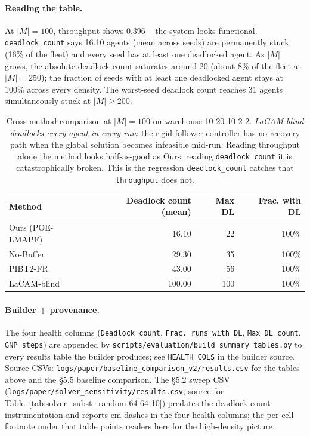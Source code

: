 \paragraph{Reading the table.}  At $|M| = 100$, throughput shows
0.396 -- the system looks functional.  \texttt{deadlock\_count} says
16.10 agents (mean across seeds) are permanently stuck (16\% of the
fleet) and every seed has at least one deadlocked agent.  As $|M|$
grows, the absolute deadlock count saturates around 20 (about 8\% of
the fleet at $|M|=250$); the fraction of seeds with at least one
deadlocked agent stays at 100\% across every density.  The
worst-seed deadlock count reaches 31 agents simultaneously stuck at
$|M| \ge 200$.

\begin{table}[t]
\centering
\small
\begin{tabular}{lrrr}
\toprule
Method & Deadlock count (mean) & Max DL & Frac. with DL \\
\midrule
Ours (POE-LMAPF) &  16.10 &  22 & 100\% \\
No-Buffer        &  29.30 &  35 & 100\% \\
PIBT2-FR         &  43.00 &  56 & 100\% \\
LaCAM-blind      & 100.00 & 100 & 100\% \\
\bottomrule
\end{tabular}
\caption{Cross-method comparison at $|M|=100$ on
warehouse-10-20-10-2-2.  \emph{LaCAM-blind deadlocks every agent in
every run}: the rigid-follower controller has no recovery path when
the global solution becomes infeasible mid-run.  Reading throughput
alone the method looks half-as-good as Ours; reading
\texttt{deadlock\_count} it is catastrophically broken.  This is the
regression \texttt{deadlock\_count} catches that \texttt{throughput}
does not.}
\label{tab:system_health_methods}
\end{table}

\paragraph{Builder + provenance.}  The four health columns
(\texttt{Deadlock count}, \texttt{Frac.\ runs with DL},
\texttt{Max DL count}, \texttt{GNP steps}) are appended by
\texttt{scripts/evaluation/build\_summary\_tables.py} to every
results table the builder produces; see \texttt{HEALTH\_COLS} in
the builder source.  Source CSVs:
\texttt{logs/paper/baseline\_comparison\_v2/results.csv} for the
tables above and the §5.5 baseline comparison.  The §5.2 sweep CSV
(\texttt{logs/paper/solver\_sensitivity/results.csv}, source for
Table~\ref{tab:solver_subst_random-64-64-10}) predates the
deadlock-count instrumentation and reports em-dashes in the four
health columns; the per-cell footnote under that table points
readers here for the high-density picture.
